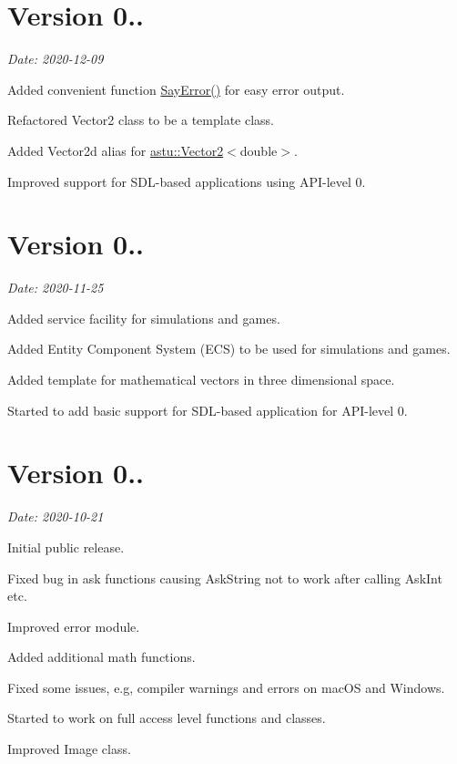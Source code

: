 \section*{Version 0..}

{\itshape Date\+: 2020-\/12-\/09}


\begin{DoxyItemize}
\item Added convenient function {\ttfamily \hyperlink{group__io__group_gaa8fd8044fbf35d58e73087b6399cd82a}{Say\+Error()}} for easy error output.
\item Refactored {\ttfamily Vector2} class to be a template class.
\item Added {\ttfamily Vector2d} alias for {\ttfamily \hyperlink{classastu_1_1Vector2}{astu\+::\+Vector2}$<$double$>$}.
\item Improved support for S\+D\+L-\/based applications using A\+P\+I-\/level 0.
\end{DoxyItemize}

\section*{Version 0..}

{\itshape Date\+: 2020-\/11-\/25}


\begin{DoxyItemize}
\item Added service facility for simulations and games.
\item Added Entity Component System (E\+CS) to be used for simulations and games.
\item Added template for mathematical vectors in three dimensional space.
\item Started to add basic support for S\+D\+L-\/based application for A\+P\+I-\/level 0.
\end{DoxyItemize}

\section*{Version 0..}

{\itshape Date\+: 2020-\/10-\/21}


\begin{DoxyItemize}
\item Initial public release.
\item Fixed bug in ask functions causing {\ttfamily Ask\+String} not to work after calling {\ttfamily Ask\+Int} etc.
\item Improved error module.
\item Added additional math functions.
\item Fixed some issues, e.\+g, compiler warnings and errors on mac\+OS and Windows.
\item Started to work on full access level functions and classes.
\item Improved Image class.
\end{DoxyItemize}

